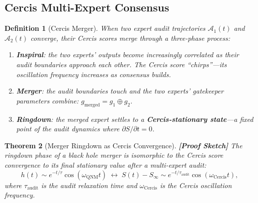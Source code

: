 \documentclass[12pt,a4paper]{article}
\newtheorem{theorem}{Theorem}[section]
\newtheorem{definition}[theorem]{Definition}
\theoremstyle{remark}
\newcommand{\Cercis}{\textsf{Cercis}}
\newcommand{\rigorSketch}{\textbf{[Proof Sketch]}}
\begin{document}
\subsection{Cercis Multi-Expert Consensus}

\begin{definition}[Cercis Merger]
\label{def:cercis_merger}
When two expert audit trajectories $\mathcal{A}_1(t)$ and $\mathcal{A}_2(t)$ converge, their \Cercis{} scores merge through a three-phase process:
\begin{enumerate}[leftmargin=*, label=(\arabic*)]
  \item \textbf{Inspiral}: the two experts' outputs become increasingly correlated as their audit boundaries approach each other. The \Cercis{} score ``chirps''---its oscillation frequency increases as consensus builds.
  \item \textbf{Merger}: the audit boundaries touch and the two experts' gatekeeper parameters combine: $g_{\text{merged}} = g_1 \oplus g_2$.
  \item \textbf{Ringdown}: the merged expert settles to a \textbf{Cercis-stationary state}---a fixed point of the audit dynamics where $\partial S / \partial t = 0$.
\end{enumerate}
\end{definition}

\begin{theorem}[Merger Ringdown as Cercis Convergence]
\label{thm:merger_ringdown}
\rigorSketch
The ringdown phase of a black hole merger is isomorphic to the \Cercis{} score convergence to its final stationary value after a multi-expert audit:
\begin{equation}
  \label{eq:merger_map}
  h(t) \sim e^{-t/\tau} \cos(\omega_{\text{QNM}} t) \;\longleftrightarrow\;
  S(t) - S_{\infty} \sim e^{-t/\tau_{\text{audit}}} \cos(\omega_{\text{Cercis}} t),
\end{equation}
where $\tau_{\text{audit}}$ is the audit relaxation time and $\omega_{\text{Cercis}}$ is the Cercis oscillation frequency.
\end{theorem}
\end{document}
